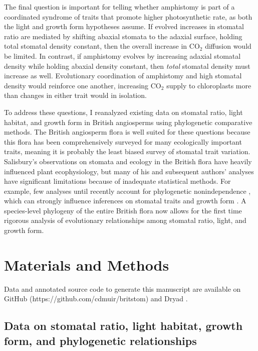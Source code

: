 \documentclass[12pt, oneside]{article}
\begin{document}
The final question is important for telling whether amphistomy is part of a coordinated syndrome of traits that promote higher photosynthetic rate, as both the light and growth form hypotheses assume. If evolved increases in stomatal ratio are mediated by shifting abaxial stomata to the adaxial surface, holding total stomatal density constant, then the overall increase in CO$_2$ diffusion would be limited. In contrast, if amphistomy evolves by increasing adaxial stomatal density while holding abaxial density constant, then \textit{total} stomatal density must increase as well. Evolutionary coordination of amphistomy and high stomatal density would reinforce one another, increasing CO$_2$ supply to chloroplasts more than changes in either trait would in isolation.

To address these questions, I reanalyzed existing data on stomatal ratio, light habitat, and growth form in British angiosperms \citep{Salisbury_1927, Fitter_Peat_1994a, BEF} using phylogenetic comparative methods. The British angiosperm flora is well suited for these questions because this flora has been comprehensively surveyed for many ecologically important traits, meaning it is probably the least biased survey of stomatal trait variation. Salisbury's observations on stomata and ecology in the British flora have heavily influenced plant ecophysiology, but many of his and subsequent authors' analyses have significant limitations because of inadequate statistical methods. For example, few analyses until recently account for phylogenetic nonindependence \citep{Felsenstein_1985}, which can strongly influence inferences on stomatal traits and growth form \citep[this study did not consider light]{Kelly_Beerling_1995}. A species-level phylogeny of the entire British flora \citep{Lim_etal_2014} now allows for the first time rigorous analysis of evolutionary relationships among stomatal ratio, light, and growth form. 


\section*{Materials and Methods}

Data and annotated source code to generate this manuscript are available on GitHub (https://github.com/cdmuir/britstom) and Dryad \citep{Muir_dryad}.

\subsection*{Data on stomatal ratio, light habitat, growth form, and phylogenetic relationships}
\end{document}
